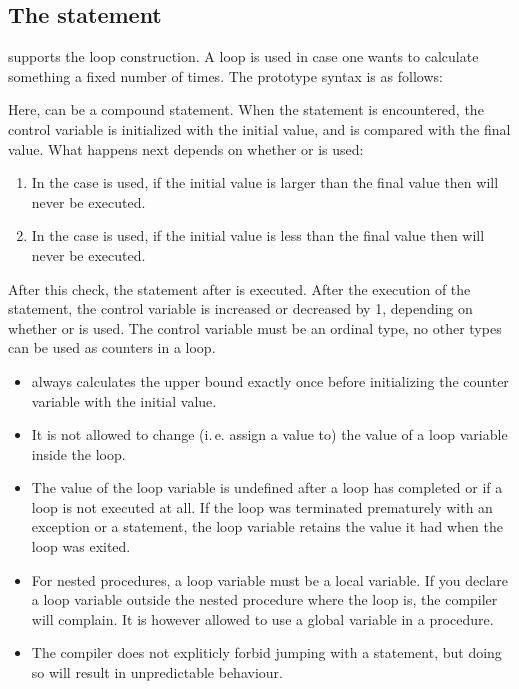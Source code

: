 \subsection{The  statement}
\fpc supports the  loop construction. A  loop is used in case
one wants to calculate something a fixed number of times.
The prototype syntax is as follows:

Here,  can be a compound statement.
When the  statement is encountered, the control variable is initialized with
the initial value, and is compared with the final value.
What happens next depends on whether  or  is used:
\begin{enumerate}
\item In the case  is used, if the initial value is larger than the final
value then  will never be executed.
\item In the case  is used, if the initial value is less than the final
value then  will never be executed.
\end{enumerate}
After this check, the statement after  is executed. After the
execution of the statement, the control variable is increased or decreased
by 1, depending on whether  or  is used.
The control variable must be an ordinal type, no other
types can be used as counters in a loop.

\begin{remark}
\begin{itemize}
\item \fpc always calculates the upper bound exactly once before initializing
the counter variable with the initial value.
\item It is not allowed to change (i.\,e. assign a value to) the value of a
loop variable inside the loop.
\item The value of the loop variable is undefined after a loop has
completed or if a loop is not executed at all. If the loop was terminated prematurely with an exception or a
 statement, the loop variable retains the value it had when the
loop was exited.
\item For nested procedures, a loop variable must be a local variable.
If you declare a loop variable outside the nested procedure where the loop is, the compiler will
complain. It is however allowed to use a global variable in a procedure.
\item The compiler does not expliticly forbid jumping with a 
statement, but doing so will result in unpredictable behaviour.
\end{itemize}
\end{remark}

